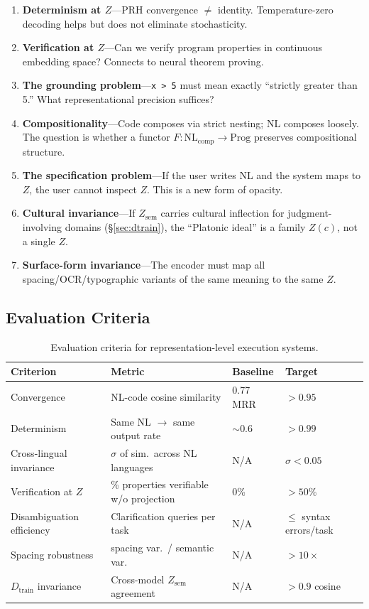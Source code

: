 \documentclass[11pt]{article}
\theoremstyle{definition}
\newcommand{\Zsem}{Z_{\text{sem}}}
\newcommand{\Dtrain}{D_{\text{train}}}
\begin{document}
\begin{enumerate}[nosep]
  \item \textbf{Determinism at $Z$}---PRH convergence $\neq$ identity. Temperature-zero decoding helps but does not eliminate stochasticity.
  \item \textbf{Verification at $Z$}---Can we verify program properties in continuous embedding space? Connects to neural theorem proving.
  \item \textbf{The grounding problem}---\texttt{x > 5} must mean exactly ``strictly greater than 5.'' What representational precision suffices?
  \item \textbf{Compositionality}---Code composes via strict nesting; NL composes loosely. The question is whether a functor $F: \mathrm{NL}_{\mathrm{comp}} \to \mathrm{Prog}$ preserves compositional structure.
  \item \textbf{The specification problem}---If the user writes NL and the system maps to $Z$, the user cannot inspect $Z$. This is a new form of opacity.
  \item \textbf{Cultural invariance}---If $\Zsem$ carries cultural inflection for judgment-involving domains (\S\ref{sec:dtrain}), the ``Platonic ideal'' is a family $Z(c)$, not a single $Z$.
  \item \textbf{Surface-form invariance}---The encoder must map all spacing/OCR/typographic variants of the same meaning to the same $Z$.
\end{enumerate}

\subsection{Evaluation Criteria}

\begin{table}[t]
\centering
\caption{Evaluation criteria for representation-level execution systems.}
\label{tab:eval}
\small
\begin{tabular}{llll}
\toprule
\textbf{Criterion} & \textbf{Metric} & \textbf{Baseline} & \textbf{Target} \\
\midrule
Convergence & NL-code cosine similarity & 0.77 MRR & $> 0.95$ \\
Determinism & Same NL $\to$ same output rate & $\sim$0.6 & $> 0.99$ \\
Cross-lingual invariance & $\sigma$ of sim.\ across NL languages & N/A & $\sigma < 0.05$ \\
Verification at $Z$ & \% properties verifiable w/o projection & 0\% & $> 50\%$ \\
Disambiguation efficiency & Clarification queries per task & N/A & $\leq$ syntax errors/task \\
Spacing robustness & spacing var.\ / semantic var. & N/A & $> 10\times$ \\
$\Dtrain$ invariance & Cross-model $\Zsem$ agreement & N/A & $> 0.9$ cosine \\
\bottomrule
\end{tabular}
\end{table}
\end{document}
